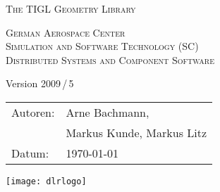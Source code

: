 \begin{titlepage}
\pagestyle{empty}

\begin{minipage}[h]{50mm}
\vspace{-10mm}
\hspace{-17mm}
\end{minipage}
%
\begin{minipage}[h]{80mm}
\vspace{-10mm}
\hspace{70mm}
\end{minipage}

   \begin{center}
       \vspace*{2cm}
       \Huge
       \textsc{The TIGL Geometry Library}

       \vspace{0.5cm}
       \Large
       \textsc{German Aerospace Center\\\vspace{0.3cm}\small{Simulation and Software Technology (SC)\\Distributed Systems and Component Software}}

       \vspace{0.5cm}
       \large
       Version 2009\,/\,5

       \vspace{0.5cm}
       \vspace{1cm}
       \textsc{}
       \vspace{1cm}

      

       \vspace{1cm}
       \Large
       \textsc{}
         \end{center}   
        
   \vfill
   \normalsize
   \begin{tabular}{ll}
       Autoren: & Arne Bachmann, \\
       & Markus Kunde, Markus Litz\\
       Datum:   & \today\\
   \end{tabular}

\begin{minipage}[h]{80mm}
\vspace{-15mm}
\hspace{90mm}
\texttt{[image: dlrlogo]}
\end{minipage}

\end{titlepage}
